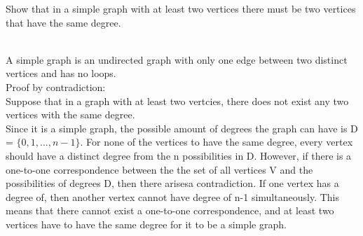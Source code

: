 \documentclass[addpoints]{exam}
\begin{document}
\begin{questions}

\question[5] Show that in a simple graph with at least two vertices there must be two vertices that have the same degree.
  \begin{solution}\\
    A simple graph is an undirected graph with only one edge between two distinct vertices and has no loops.\\
    Proof by contradiction:\\
    Suppose that in a graph with at least two vertcies, there does not exist any two vertices with the same degree.\\
    Since it is a simple graph, the possible amount of degrees the graph can have is D = $\{0,1,...,n-1\}$. For none of the vertices to 
    have the same degree, every vertex should have a distinct degree from the n possibilities in D. However, if there is a one-to-one correspondence
    between the the set of all vertices V and the possibilities of degrees D, then there arisesa contradiction. If one vertex has a degree of, then another
    vertex cannot have degree of n-1 simultaneously. This means that there cannot exist a one-to-one correspondence, and at least two vertices
    have to have the same degree for it to be a simple graph. 



\end{solution}
\end{questions}
\end{document}
